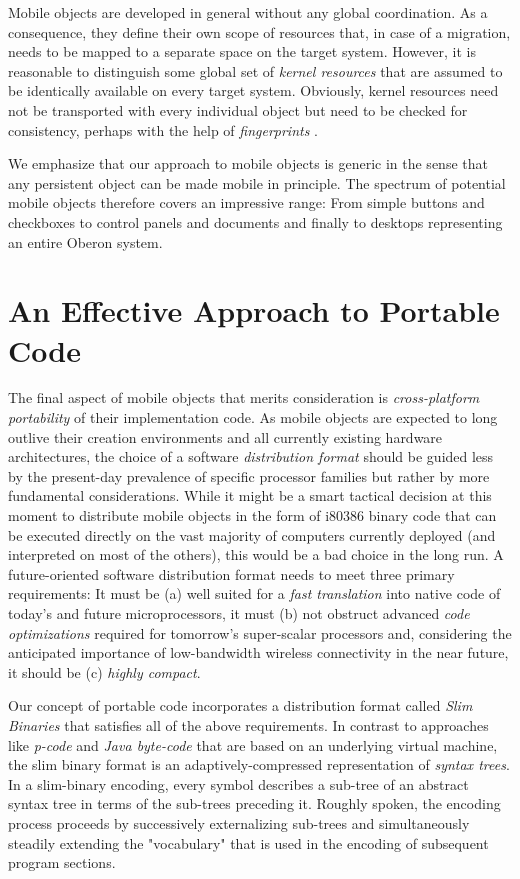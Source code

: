 \ein
Mobile objects are developed in general without any global coordination.
As a consequence, they define their own scope of resources that, in case
of a migration, needs to be mapped to a separate space on the target system.
However, it is reasonable to distinguish some global set of {\em kernel
resources\/} that are assumed to be identically available on every target
system. Obviously, kernel resources need not be transported with every
individual object but need to be checked for consistency, perhaps with
the help of {\em fingerprints\/} \cite{Fingerprints}.

\ein
We emphasize that our approach to mobile objects is generic in the sense
that any persistent object can be made mobile in principle. The spectrum
of potential mobile objects therefore covers an impressive range: From
simple buttons and checkboxes to control panels and documents and finally
to desktops representing an entire Oberon system.
 
\medskip

\section{An Effective Approach to Portable Code}

The final aspect of mobile objects that merits consideration is
{\em cross-platform portability\/} of their implementation code.
As mobile objects are expected to long outlive their creation environments
and all currently existing hardware architectures, the choice of a software
{\em distribution format\/} should be guided less by the present-day
prevalence of specific processor families but rather by more fundamental
considerations. While it might be a smart tactical decision at this moment
to distribute mobile objects in the form of i80386 binary code that
can be executed directly on the vast majority of computers currently
deployed (and interpreted on most of the others), this would be a bad
choice in the long run. A future-oriented software distribution format
needs to meet three primary requirements: It must be (a) well suited
for a {\em fast translation\/} into native code of today's and future
microprocessors, it must (b) not obstruct advanced {\em code optimizations\/}
required for tomorrow's super-scalar processors and, considering
the anticipated importance of low-bandwidth wireless connectivity
in the near future, it should be (c) {\em highly compact}.

\ein
Our concept of portable code incorporates a distribution format called
{\em Slim Binaries\/} \cite{F1} that satisfies all of the above requirements.
In contrast to approaches like {\em p-code\/} and {\em Java byte-code\/}
\cite{F2} that are based on an underlying virtual machine, the slim binary
format is an adaptively-compressed representation of {\em syntax trees}.
In a slim-binary encoding, every symbol describes a sub-tree of an abstract
syntax tree in terms of the sub-trees preceding it. Roughly spoken,
the encoding process proceeds by successively externalizing sub-trees and
simultaneously steadily extending the "vocabulary" that is used in the
encoding 
of subsequent program sections.

